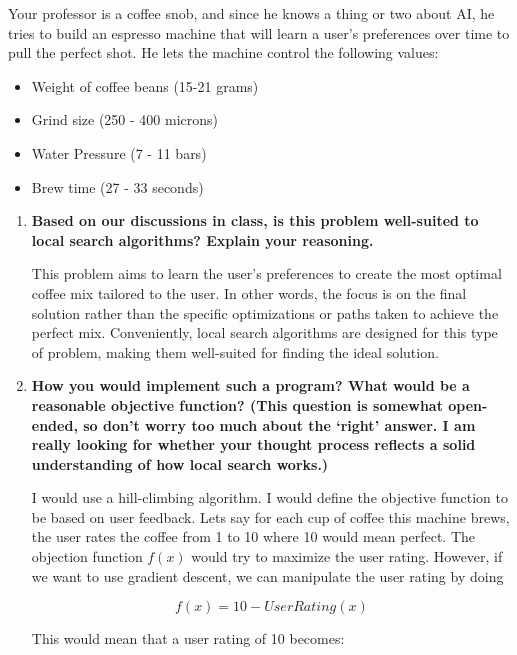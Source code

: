 \documentclass[a4paper]{article}
\begin{document}
\begin{sloppypar}
Your professor is a coffee snob, and since he knows a thing or two about AI, he tries to
build an espresso machine that will learn a user’s preferences over time to pull the perfect
shot. He lets the machine control the following values:

\begin{itemize}
    \item Weight of coffee beans (15-21 grams)
    \item Grind size (250 - 400 microns)
    \item Water Pressure (7 - 11 bars)
    \item Brew time (27 - 33 seconds)
\end{itemize}

\begin{enumerate}[start=9,label=Q\arabic*,left=0pt]
    \item \textbf{Based on our discussions in class, is this problem well-suited to local search algorithms? Explain your reasoning.}
    
    \par This problem aims to learn the user’s preferences to create the most optimal coffee mix tailored to the user. 
    In other words, the focus is on the final solution rather than the specific optimizations or paths taken to achieve the perfect mix. 
    Conveniently, local search algorithms are designed for this type of problem, making them well-suited for finding the ideal solution.
    
    \item \textbf{How you would implement such a program? What would be a reasonable objective function? (This question is somewhat open-ended, so don’t worry too much about the ‘right’ answer. I am really looking for whether your thought process reflects a solid understanding of how local search works.)}
    
    \par I would use a hill-climbing algorithm. I would define the objective function to be based on user feedback.
    Lets say for each cup of coffee this machine brews, the user rates the coffee from 1 to 10 where 10 would mean perfect.
    The objection function $f(x)$ would try to maximize the user rating. However, if we want to use gradient descent, we can manipulate the 
    user rating by doing 
    
    \[ f(x) = 10 - User Rating(x) \]

    This would mean that a user rating of 10 becomes:


\end{enumerate}
\end{sloppypar}
\end{document}
